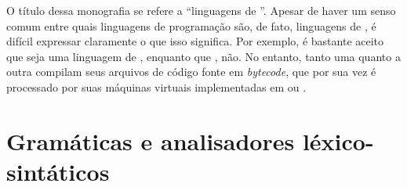   O título dessa monografia se refere a ``linguagens de \script{}''. Apesar de
  haver um senso comum entre quais linguagens de programação são, de fato,
  linguagens de \script{}, é difícil expressar claramente o que isso significa.
  Por exemplo, é bastante aceito que  seja uma linguagem de \script{},
  enquanto que , não. %
  No entanto, tanto uma quanto a outra compilam seus arquivos de código fonte em
  \emph{bytecode}, que por sua vez é processado por suas máquinas virtuais
  implementadas em \C{} ou \CXX{}.

  \section{Gramáticas e analisadores léxico-sintáticos}
  \label{cap:conceitos:gramaticas}

